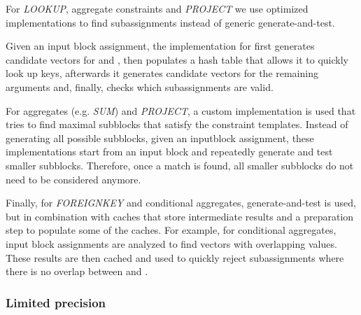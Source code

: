 For \textit{LOOKUP}, aggregate constraints and \textit{PROJECT} we use optimized implementations to find subassignments instead of generic generate-and-test.

Given an input block assignment, the implementation for  first generates candidate vectors for  and , then populates a hash table that allows it to quickly look up keys, afterwards it generates candidate vectors for the remaining arguments and, finally, checks which subassignments are valid.

For aggregates (e.g. \textit{SUM}) and \textit{PROJECT}, a custom implementation is used that tries to find maximal subblocks that satisfy the constraint templates.
Instead of generating all possible subblocks, given an inputblock assignment, these implementations start from an input block and repeatedly generate and test smaller subblocks.
Therefore, once a match is found, all smaller subblocks do not need to be considered anymore.

Finally, for \textit{FOREIGNKEY} and conditional aggregates, generate-and-test is used, but in combination with caches that store intermediate results and a preparation step to populate some of the caches.
For example, for conditional aggregates, input block assignments are analyzed to find vectors with overlapping values.
These results are then cached and used to quickly reject subassignments where there is no overlap between  and .

\subsubsection{Limited precision}




